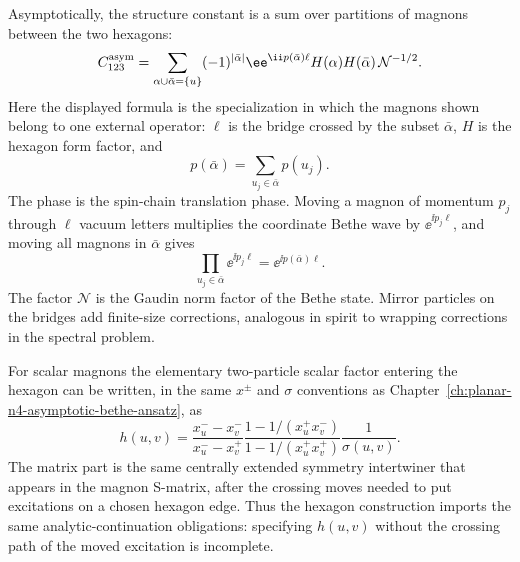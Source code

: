 Asymptotically, the structure constant is a sum over partitions of magnons
between the two hexagons:
\[
  C_{123}^{\rm asym}
  =
  \sum_{\alpha\cup\bar\alpha=\{u\}}
  (-1)^{|\bar\alpha|}
  \ee^{\ii p(\bar\alpha)\ell}
  H(\alpha)H(\bar\alpha)\,
  \mathcal N^{-1/2}.
\]
Here the displayed formula is the specialization in which the magnons shown
belong to one external operator: \(\ell\) is the bridge crossed by the subset
\(\bar\alpha\), \(H\) is the hexagon form factor, and
\[
  p(\bar\alpha)=\sum_{u_j\in\bar\alpha}p(u_j).
\]
The phase is the spin-chain translation phase.  Moving a magnon of momentum
\(p_j\) through \(\ell\) vacuum letters multiplies the coordinate Bethe wave
by \(\ee^{\ii p_j\ell}\), and moving all magnons in \(\bar\alpha\) gives
\begin{equation}
  \prod_{u_j\in\bar\alpha}\ee^{\ii p_j\ell}
  =
  \ee^{\ii p(\bar\alpha)\ell}.
  \label{eq:planar-n4-hexagon-bridge-translation-phase}
\end{equation}
The factor \(\mathcal N\) is the Gaudin norm factor of the Bethe state.
Mirror particles on the bridges add finite-size corrections, analogous in
spirit to wrapping corrections in the spectral problem.

For scalar magnons the elementary two-particle scalar factor entering the
hexagon can be written, in the same \(x^\pm\) and \(\sigma\) conventions as
Chapter~\ref{ch:planar-n4-asymptotic-bethe-ansatz}, as
\begin{equation}
  h(u,v)
  =
  \frac{x_u^- -x_v^-}{x_u^- -x_v^+}
  \frac{1-1/(x_u^+x_v^-)}{1-1/(x_u^+x_v^+)}
  \frac{1}{\sigma(u,v)} .
  \label{eq:planar-n4-hexagon-scalar-factor}
\end{equation}
The matrix part is the same centrally extended symmetry intertwiner that
appears in the magnon S-matrix, after the crossing moves needed to put
excitations on a chosen hexagon edge.  Thus the hexagon construction imports
the same analytic-continuation obligations: specifying \(h(u,v)\) without the
crossing path of the moved excitation is incomplete.

